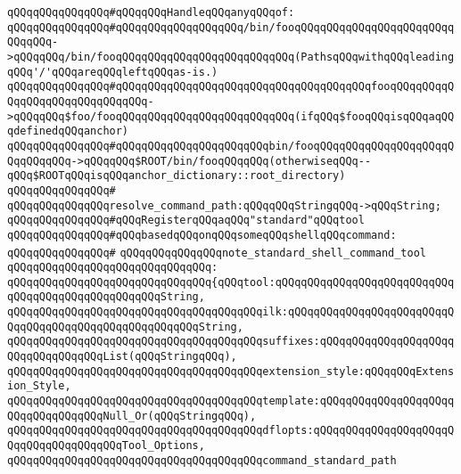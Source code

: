 \newline
\verb|qQQqqQQqqQQqqQQq#qQQqqQQqHandleqQQqanyqQQqof:|\newline
\verb|qQQqqQQqqQQqqQQq#qQQqqQQqqQQqqQQqqQQq/bin/fooqQQqqQQqqQQqqQQqqQQqqQQqqQQqqQQq->qQQqqQQq/bin/fooqQQqqQQqqQQqqQQqqQQqqQQqqQQq(PathsqQQqwithqQQqleadingqQQq'/'qQQqareqQQqleftqQQqas-is.)|\newline
\verb|qQQqqQQqqQQqqQQq#qQQqqQQqqQQqqQQqqQQqqQQqqQQqqQQqqQQqqQQqfooqQQqqQQqqQQqqQQqqQQqqQQqqQQqqQQq->qQQqqQQq$foo/fooqQQqqQQqqQQqqQQqqQQqqQQqqQQq(ifqQQq$fooqQQqisqQQqaqQQqdefinedqQQqanchor)|\newline
\verb|qQQqqQQqqQQqqQQq#qQQqqQQqqQQqqQQqqQQqqQQqbin/fooqQQqqQQqqQQqqQQqqQQqqQQqqQQqqQQq->qQQqqQQq$ROOT/bin/fooqQQqqQQq(otherwiseqQQq--qQQq$ROOTqQQqisqQQqanchor_dictionary::root_directory)|\newline
\verb|qQQqqQQqqQQqqQQq#|\newline
\verb|qQQqqQQqqQQqqQQqresolve_command_path:qQQqqQQqStringqQQq->qQQqString;|\newline
\newline
\verb|qQQqqQQqqQQqqQQq#qQQqRegisterqQQqaqQQq"standard"qQQqtool|\newline
\verb|qQQqqQQqqQQqqQQq#qQQqbasedqQQqonqQQqsomeqQQqshellqQQqcommand:|\newline
\verb|qQQqqQQqqQQqqQQq#|\newline
\verb|qQQqqQQqqQQqqQQqnote_standard_shell_command_tool|\newline
\verb|qQQqqQQqqQQqqQQqqQQqqQQqqQQqqQQq:|\newline
\verb|qQQqqQQqqQQqqQQqqQQqqQQqqQQqqQQq{qQQqtool:qQQqqQQqqQQqqQQqqQQqqQQqqQQqqQQqqQQqqQQqqQQqqQQqqQQqString,|\newline
\verb|qQQqqQQqqQQqqQQqqQQqqQQqqQQqqQQqqQQqqQQqilk:qQQqqQQqqQQqqQQqqQQqqQQqqQQqqQQqqQQqqQQqqQQqqQQqqQQqqQQqString,|\newline
\verb|qQQqqQQqqQQqqQQqqQQqqQQqqQQqqQQqqQQqqQQqsuffixes:qQQqqQQqqQQqqQQqqQQqqQQqqQQqqQQqqQQqList(qQQqStringqQQq),|\newline
\verb|qQQqqQQqqQQqqQQqqQQqqQQqqQQqqQQqqQQqqQQqextension_style:qQQqqQQqExtension_Style,|\newline
\verb|qQQqqQQqqQQqqQQqqQQqqQQqqQQqqQQqqQQqqQQqtemplate:qQQqqQQqqQQqqQQqqQQqqQQqqQQqqQQqqQQqNull_Or(qQQqStringqQQq),|\newline
\verb|qQQqqQQqqQQqqQQqqQQqqQQqqQQqqQQqqQQqqQQqdflopts:qQQqqQQqqQQqqQQqqQQqqQQqqQQqqQQqqQQqqQQqTool_Options,|\newline
\newline
\verb|qQQqqQQqqQQqqQQqqQQqqQQqqQQqqQQqqQQqqQQqcommand_standard_path|\newline
